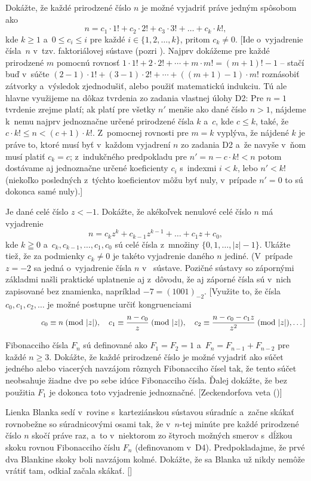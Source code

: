 {Dokážte, že každé prirodzené číslo $n$ je možné vyjadriť práve jedným spôsobom ako
$$
n=c_1\cdot 1!+c_2\cdot 2!+c_3\cdot 3!+\dots+c_k\cdot k!,
$$
kde $k\geq1$ a~$0\le c_i\le i$ pre každé $i\in\{1,2,\dots,k\}$, pritom $c_k\ne0$.
 [Ide o~vyjadrenie čísla~$n$ v~tzv. faktoriálovej sústave (pozri ). Najprv dokážeme pre každé prirodzené $m$ pomocnú rovnosť $1\cdot 1!+2\cdot 2!+\cdots+m\cdot m!=(m+1)!-1$ -- stačí buď v~súčte $(2-1)\cdot 1!+(3-1)\cdot 2!+\cdots+((m+1)-1)\cdot m!$ roznásobiť zátvorky a~výsledok zjednodušiť, alebo použiť matematickú indukciu. Tú ale hlavne využijeme na dôkaz tvrdenia zo zadania vlastnej úlohy D2: Pre $n=1$ tvrdenie zrejme platí; ak platí pre všetky $n'$ menšie ako dané číslo $n>1$, nájdeme k~nemu najprv jednoznačne určené prirodzené čísla $k$ a~$c$, kde $c\le k$, také, že $c \cdot k!\le n<(c+1)\cdot k!$. Z~pomocnej rovnosti pre $m=k$ vyplýva, že nájdené $k$ je práve to, ktoré musí byť v~každom vyjadrení $n$ zo zadania D2 a~že navyše v~ňom musí platiť $c_k=c$; z~indukčného predpokladu pre $n'=n-c\cdot k!<n$ potom dostávame aj jednoznačne určené koeficienty $c_i$ s~indexmi $i<k$, lebo $n'<k!$ (niekoľko posledných z~týchto koeficientov môžu byť nuly, v~prípade $n'=0$ to sú dokonca samé nuly).]

Je dané celé číslo $z<-1$.
Dokážte, že akékoľvek nenulové celé číslo $n$ má vyjadrenie
$$
n=c_kz^k+c_{k-1}z^{k-1}+\dots+c_1z+c_0,
$$
kde $k\geqq0$ a~$c_k,c_{k-1},\dots,c_1,c_0$ sú celé čísla z~množiny
$\{0,1,\dots,|z|-1\}$. Ukážte tiež, že za podmienky $c_k\ne0$ je takéto vyjadrenie daného $n$ jediné. (V~prípade $z={-2}$ sa jedná o~vyjadrenie čísla $n$ v~ sústave. Pozičné sústavy so zápornými základmi našli praktické uplatnenie aj z~dôvodu, že aj záporné čísla sú v~nich zapisované bez znamienka, napríklad $-7=(1001)_{-2}$.
 [Využite to, že čísla $c_0,c_1,c_2,\dots$ je možné postupne určiť kongruenciami
$$\hskip 3\parindent minus 1cm
c_0\equiv n\!\pmod{|z|},\quad c_1\equiv\frac{n-c_0}{z}\!\pmod{|z|},\quad c_2\equiv\frac{n-c_0 -c_1z}{z^2}\!\pmod{|z|}, \dots ]
$$


Fibonacciho čísla $F_n$ sú definované ako $F_1=F_2=1$ a~$F_n=F_{n-1}+F_{n-2}$ pre každé $n\ge 3$.
Dokážte, že každé prirodzené číslo je možné vyjadriť ako súčet jedného alebo viacerých navzájom rôznych Fibonacciho čísel tak, že tento súčet neobsahuje žiadne dve po sebe idúce Fibonacciho čísla.
Ďalej dokážte, že bez použitia $F_1$ je dokonca toto vyjadrenie jednoznačné.
 [Zeckendorfova veta ()]


Lienka Blanka sedí v~rovine s~karteziánskou sústavou súradníc a~začne skákať rovnobežne so súradnicovými
osami tak, že v~$n$-tej minúte pre každé prirodzené číslo $n$ skočí práve raz, a~to v~niektorom zo štyroch možných smerov s~dĺžkou skoku rovnou Fibonacciho číslu $F_n$ (definovanom v~D4). Predpokladajme, že prvé dva Blankine skoky boli navzájom kolmé. Dokážte, že sa Blanka už nikdy nemôže vrátiť tam, odkiaľ začala skákať.
    []

}

